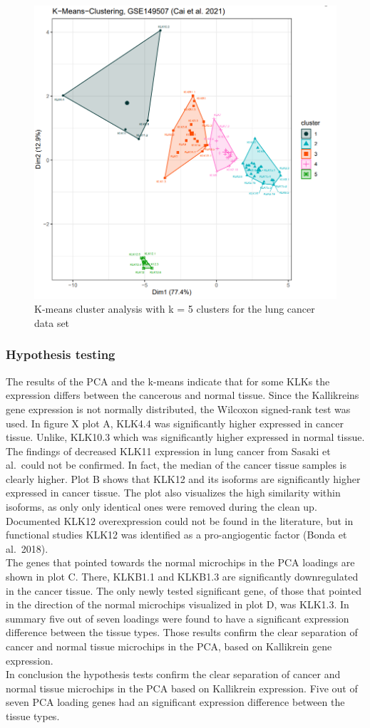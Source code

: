 \documentclass[
]{article}
\begin{document}
\begin{figure}

{\centering \includegraphics[width=0.5\linewidth]{images/kmeans_5_lung} 

}

\caption{K-means cluster analysis with k = 5 clusters for the lung cancer data set}\label{fig:K-means plot - lung }
\end{figure}

\hypertarget{hypothesis-testing-1}{%
\subsubsection{Hypothesis testing}\label{hypothesis-testing-1}}

The results of the PCA and the k-means indicate that for some KLKs the
expression differs between the cancerous and normal tissue. Since the
Kallikreins gene expression is not normally distributed, the Wilcoxon
signed-rank test was used. In figure X plot A, KLK4.4 was significantly
higher expressed in cancer tissue. Unlike, KLK10.3 which was
significantly higher expressed in normal tissue. The findings of
decreased KLK11 expression in lung cancer from Sasaki et al.~could not
be confirmed. In fact, the median of the cancer tissue samples is
clearly higher. Plot B shows that KLK12 and its isoforms are
significantly higher expressed in cancer tissue. The plot also
visualizes the high similarity within isoforms, as only only identical
ones were removed during the clean up. Documented KLK12 overexpression
could not be found in the literature, but in functional studies KLK12
was identified as a pro-angiogentic factor (Bonda et al.~2018).\\
The genes that pointed towards the normal microchips in the PCA loadings
are shown in plot C. There, KLKB1.1 and KLKB1.3 are significantly
downregulated in the cancer tissue. The only newly tested significant
gene, of those that pointed in the direction of the normal microchips
visualized in plot D, was KLK1.3. In summary five out of seven loadings
were found to have a significant expression difference between the
tissue types. Those results confirm the clear separation of cancer and
normal tissue microchips in the PCA, based on Kallikrein gene
expression.\\
In conclusion the hypothesis tests confirm the clear separation of
cancer and normal tissue microchips in the PCA based on Kallikrein
expression. Five out of seven PCA loading genes had an significant
expression difference between the tissue types.
\end{document}
